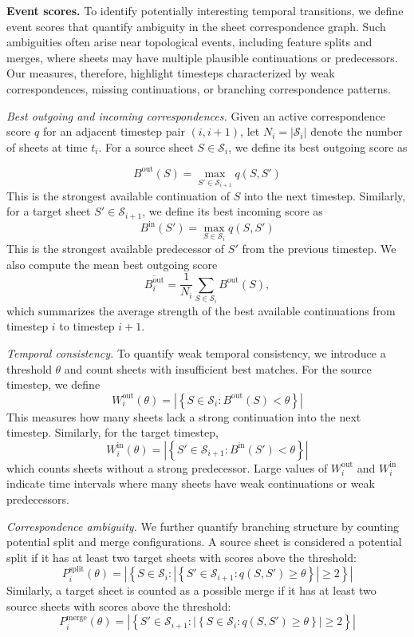 \documentclass[review]{vgtc}                          %
\newcommand{\Sheets}{\mathcal{S}}
\newcommand{\Sheet}{S}
\newcommand{\myparagraph}[1]{\vspace{1mm} \noindent \textbf{#1}}
\begin{document}
\myparagraph{Event scores.} 
To identify potentially interesting temporal transitions, we define event scores that quantify ambiguity in the sheet correspondence graph. Such ambiguities often arise near topological events, including feature splits and merges, where sheets may have multiple plausible continuations or predecessors. Our measures, therefore, highlight timesteps characterized by weak correspondences, missing continuations, or branching correspondence patterns.

\emph{Best outgoing and incoming correspondences.}
Given an active correspondence score $q$ for an adjacent timestep pair $(i,i+1)$, let $N_i=|\Sheets_i|$ denote the number of sheets at time $t_i$. For a source sheet $\Sheet\in\Sheets_i$, we define its best outgoing score as

$$
B^\mathrm{out}(\Sheet)=
\max_{\Sheet'\in\Sheets_{i+1}} q(\Sheet,\Sheet')
$$
This is the strongest available continuation of $\Sheet$ into the next timestep. Similarly, for a target sheet $\Sheet'\in\Sheets_{i+1}$, we define its best incoming score as
$$
B^\mathrm{in}(\Sheet')=
\max_{\Sheet\in\Sheets_i} q(\Sheet,\Sheet')
$$
This is the strongest available predecessor of $\Sheet'$ from the previous timestep. We also compute the mean best outgoing score
$$
\overline{B^\mathrm{out}_i}=
\frac{1}{N_i}
\sum_{\Sheet\in\Sheets_i}
B^\mathrm{out}(\Sheet),
$$
which summarizes the average strength of the best available continuations from timestep $i$ to timestep $i+1$.

\emph{Temporal consistency.} To quantify weak temporal consistency, we introduce a threshold $\theta$ and count sheets with insufficient best matches. For the source timestep, we define
$$
W^\mathrm{out}_i(\theta)=
\left|
\left\{
\Sheet\in\Sheets_i:
B^\mathrm{out}(\Sheet)<\theta
\right\}
\right|
$$
This measures how many sheets lack a strong continuation into the next timestep. Similarly, for the target timestep,
$$
W^\mathrm{in}_i(\theta)=
\left|
\left\{
\Sheet'\in\Sheets_{i+1}:
B^\mathrm{in}(\Sheet')<\theta
\right\}
\right|
$$
which counts sheets without a strong predecessor. Large values of $W^\mathrm{out}_i$ and $
W^\mathrm{in}_i$ indicate time intervals where many sheets have weak continuations or weak predecessors.

\emph{Correspondence ambiguity.} 
We further quantify branching structure by counting potential split and merge configurations. A source sheet is considered a potential split if it has at least two target sheets with scores above the threshold:
$$
P^\mathrm{split}_i(\theta)=
\left|
\left\{
\Sheet\in\Sheets_i:
\left|
\left\{
\Sheet'\in\Sheets_{i+1}:
q(\Sheet,\Sheet')\geq\theta
\right\}
\right|
\geq 2
\right\}
\right|
$$
Similarly, a target sheet is counted as a possible merge if it has at least two source sheets with scores above the threshold:
$$
P^\mathrm{merge}_i(\theta)=
\left|
\left\{
\Sheet'\in\Sheets_{i+1}:
\left|
\left\{
\Sheet\in\Sheets_i:
q(\Sheet,\Sheet')\geq\theta
\right\}
\right|
\geq 2
\right\}
\right|
$$
\end{document}
